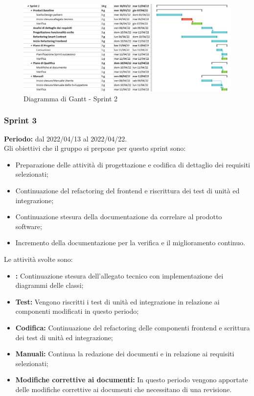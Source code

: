 \begin{figure}[H]
  \centering
  \includegraphics[scale=0.55]{immagini/2sprint.png}
  \caption{Diagramma di Gantt - Sprint 2}
\end{figure}

\subsubsection{Sprint 3} \label{subsubsection:sprint_3}
\textbf{Periodo:} dal 2022/04/13 al 2022/04/22.
\bigskip
\\Gli obiettivi che il gruppo si prepone per questo sprint\glo{} sono:
\begin{itemize}
  \item Preparazione delle attività di progettazione e codifica di dettaglio dei requisiti selezionati;
  \item Continuazione del refactoring\glo{} del frontend\glo{} e riscrittura dei test di unità ed integrazione;
  \item Continuazione stesura della documentazione da correlare al prodotto software;
  \item Incremento della documentazione per la verifica e il miglioramento continuo.
\end{itemize}
Le attività svolte sono:
\begin{itemize}
  \item \textbf{\PB{}:} Continuazione stesura dell’allegato tecnico con implementazione dei diagrammi delle classi;
  \item \textbf{Test:} Vengono riscritti i test di unità ed integrazione in relazione ai componenti modificati in questo periodo;
  \item \textbf{Codifica:} Continuazione del refactoring\glo{} delle componenti frontend\glo{} e scrittura dei test di unità ed integrazione;
  \item \textbf{Manuali:} Continua la redazione dei documenti \docNameVersionMU{} e \docNameVersionMS{} in relazione ai requisiti selezionati;
  \item \textbf{Modifiche correttive ai documenti:} In questo periodo vengono apportate delle modifiche correttive ai documenti che necessitano di una revisione.
\end{itemize}

